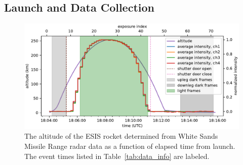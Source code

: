     	
	
    
	\subsection{Launch and Data Collection} 
		\begin{figure}[ht]
			\begin{center}
				\includegraphics{figures/signal_and_altitude_vs_time}
				\caption{The altitude of the ESIS rocket determined from White Sands Missile Range radar data as a function of elapsed time from launch.  The event times listed in Table~\ref{tab:data_info} are labeled.}
				\label{fig:timeline}
			\end{center}
		\end{figure}

